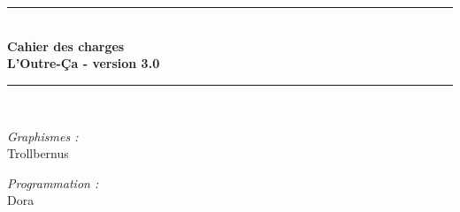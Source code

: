 \documentclass[french]{report}
\newcommand{\HRule}{\rule{\linewidth}{0.5mm}}
\theoremstyle{plain}
\begin{document}
\begin{titlepage}
\begin{center}
\begin{minipage}[t]{0.3\textwidth}
\begin{flushright}
	  \end{flushright}
	\end{minipage}
	\\[1cm]


	\textsc{\Large }\\[0.6cm]
	\HRule \\[0.8cm]
	{\huge \bfseries Cahier des charges \\ L'Outre-Ça - version 3.0}\\[0.4cm]
	\HRule \\[1cm]

	\begin{minipage}[t]{0.3\textwidth}
	  \begin{flushleft} \large
	    \emph{Graphismes :}\\
	    Trollbernus
	  \end{flushleft}
	\end{minipage}
	\begin{minipage}[t]{0.6\textwidth}
	  \begin{flushright} \large
	    \emph{Programmation :} \\
		Dora  


	  \end{flushright}

	\end{minipage}

















\end{center}
\end{titlepage}
\end{document}
